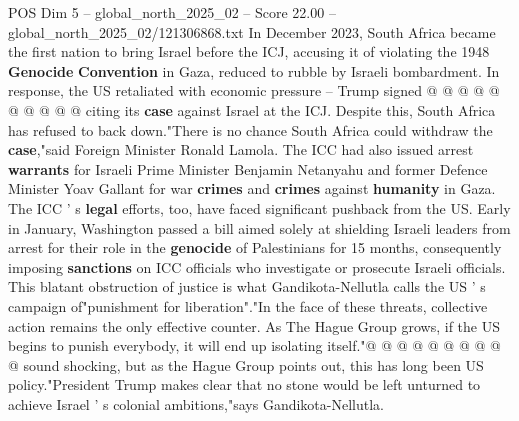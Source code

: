 \begin{textsample}{POS Dim 5 – global\_north\_2025\_02 – Score 22.00 – global\_north\_2025\_02/121306868.txt}
In December 2023, South Africa became the first nation to bring Israel before the ICJ, accusing it of violating the 1948 \textbf{Genocide} \textbf{Convention} in Gaza, reduced to rubble by Israeli bombardment.
In response, the US retaliated with economic pressure -- Trump signed @ @ @ @ @ @ @ @ @ @ citing its \textbf{case} against Israel at the ICJ.
Despite this, South Africa has refused to back down."There is no chance South Africa could withdraw the \textbf{case},"said Foreign Minister Ronald Lamola.
The ICC had also issued arrest \textbf{warrants} for Israeli Prime Minister Benjamin Netanyahu and former Defence Minister Yoav Gallant for war \textbf{crimes} and \textbf{crimes} against \textbf{humanity} in Gaza.
The ICC ' s \textbf{legal} efforts, too, have faced significant pushback from the US.
Early in January, Washington passed a bill aimed solely at shielding Israeli leaders from arrest for their role in the \textbf{genocide} of Palestinians for 15 months, consequently imposing \textbf{sanctions} on ICC officials who investigate or prosecute Israeli officials.
This blatant obstruction of justice is what Gandikota-Nellutla calls the US ' s campaign of"punishment for liberation"."In the face of these threats, collective action remains the only effective counter.
As The Hague Group grows, if the US begins to punish everybody, it will end up isolating itself."@ @ @ @ @ @ @ @ @ @ sound shocking, but as the Hague Group points out, this has long been US policy."President Trump makes clear that no stone would be left unturned to achieve Israel ' s colonial ambitions,"says Gandikota-Nellutla.

\end{textsample}
